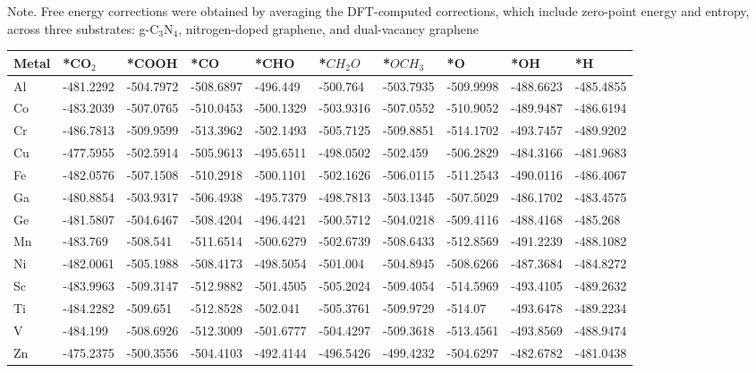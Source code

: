 Note. Free energy corrections were obtained by averaging the DFT-computed corrections, which include zero-point energy and entropy, across three substrates: g-C$_3$N$_4$, nitrogen-doped graphene, and dual-vacancy graphene


\begin{table}[h]
  \centering
  {\fontsize{6}{12}\selectfont
  \begin{tabular}{*{10}{l}}
    \hline
    Metal & *CO$_2$ & *COOH & *CO & *CHO & *$CH_2O$ & *$OCH_3$ & *O & *OH & *H \\
    \hline
    Al & -481.2292 & -504.7972 & -508.6897 & -496.449  & -500.764  & -503.7935 & -509.9998 & -488.6623 & -485.4855 \\
    Co & -483.2039 & -507.0765 & -510.0453 & -500.1329 & -503.9316 & -507.0552 & -510.9052 & -489.9487 & -486.6194 \\
    Cr & -486.7813 & -509.9599 & -513.3962 & -502.1493 & -505.7125 & -509.8851 & -514.1702 & -493.7457 & -489.9202 \\
    Cu & -477.5955 & -502.5914 & -505.9613 & -495.6511 & -498.0502 & -502.459  & -506.2829 & -484.3166 & -481.9683 \\
    Fe & -482.0576 & -507.1508 & -510.2918 & -500.1101 & -502.1626 & -506.0115 & -511.2543 & -490.0116 & -486.4067 \\
    Ga & -480.8854 & -503.9317 & -506.4938 & -495.7379 & -498.7813 & -503.1345 & -507.5029 & -486.1702 & -483.4575 \\
    Ge & -481.5807 & -504.6467 & -508.4204 & -496.4421 & -500.5712 & -504.0218 & -509.4116 & -488.4168 & -485.268  \\
    Mn & -483.769  & -508.541  & -511.6514 & -500.6279 & -502.6739 & -508.6433 & -512.8569 & -491.2239 & -488.1082 \\
    Ni & -482.0061 & -505.1988 & -508.4173 & -498.5054 & -501.004  & -504.8945 & -508.6266 & -487.3684 & -484.8272 \\
    Sc & -483.9963 & -509.3147 & -512.9882 & -501.4505 & -505.2024 & -509.4054 & -514.5969 & -493.4105 & -489.2632 \\
    Ti & -484.2282 & -509.651  & -512.8528 & -502.041  & -505.3761 & -509.9729 & -514.07   & -493.6478 & -489.2234 \\
    V  & -484.199  & -508.6926 & -512.3009 & -501.6777 & -504.4297 & -509.3618 & -513.4561 & -493.8569 & -488.9474 \\
    Zn & -475.2375 & -500.3556 & -504.4103 & -492.4144 & -496.5426 & -499.4232 & -504.6297 & -482.6782 & -481.0438 \\

\end{tabular}}
\end{table}
